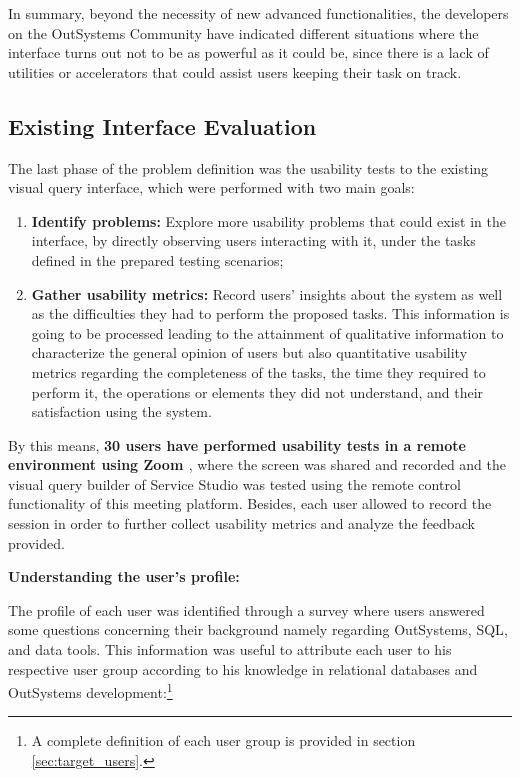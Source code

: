 In summary, beyond the necessity of new advanced functionalities, the developers on the OutSystems Community have indicated different situations where the interface turns out not to be as powerful as it could be, since there is a lack of utilities or accelerators that could assist users keeping their task on track.

\subsection{Existing Interface Evaluation}
\label{sec:existing_interface_evaluation}
The last phase of the problem definition was the usability tests to the existing visual query interface, which were performed with two main goals:

\begin{enumerate}
    \item \textbf{Identify problems:} Explore more usability problems that could exist in the interface, by directly observing users interacting with it, under the tasks defined in the prepared testing scenarios;
    \item \textbf{Gather usability metrics:} Record users' insights about the system as well as the difficulties they had to perform the proposed tasks. This information is going to be processed leading to the attainment of qualitative information to characterize the general opinion of users but also quantitative usability metrics regarding the completeness of the tasks, the time they required to perform it, the operations or elements they did not understand, and their satisfaction using the system.
\end{enumerate}

By this means, \textbf{30 users have performed usability tests in a remote environment using Zoom \cite{zoom}}, where the screen was shared and recorded and the visual query builder of Service Studio was tested using the remote control functionality of this meeting platform. Besides, each user allowed to record the session in order to further collect usability metrics and analyze the feedback provided.

\medskip
\textbf{Understanding the user's profile:}
\medskip

The profile of each user was identified through a survey where users answered some questions concerning their background namely regarding OutSystems, \gls{SQL}, and data tools. This information was useful to attribute each user to his respective user group according to his knowledge in relational databases and OutSystems development:\footnote{A complete definition of each user group is provided in section \ref{sec:target_users}.}


